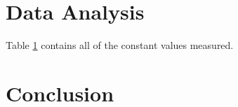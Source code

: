 \documentclass[aps,prl,10pt,twocolumn,floatfix]{revtex4-2}
\begin{document}
\section{Data Analysis}
Table \ref{measure} contains all of the constant values measured.

\begin{figure}\label{measure}
\end{figure}


\section{Conclusion}


\end{document}

